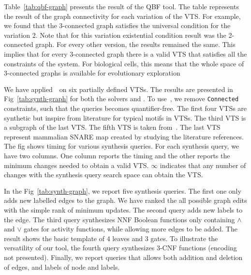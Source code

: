 Table~\ref{tab:qbf-graph} presents the result of the QBF tool.
%
The table represents the result of the graph connectivity for each variation of the VTS.  
%
For example, we found that the 3-connected graph satisfies the universal condition for the variation 2. 
%
Note that for this variation existential condition result was the 2-connected graph. 
%
For every other version, the results remained the same.
%
This implies that for every 3-connected graph there is a valid VTS that satisfies all the constraints of the system.
% 
For biological cells, this means that the whole space of 3-connected graphs is available for evolutionary exploration
%



We have applied~\ourtool~on six partially defined VTSs.
%
The results are presented in Fig~\ref{tab:synth-graph} for both the solvers
\depqbf and \zthree.
%
To use~\zthree, we remove \texttt{Connected} constraints, such that the queries becomes
quantifier-free.
%
%
%
The first four VTSs are synthetic but inspire from literature for
typical motifs in VTSs. 
The third VTS is a subgraph of the last VTS.
%
%
The fifth VTS is taken from~\cite{burri2004complete}.
%
The last VTS represent mammalian SNARE map created by studying the literature references.  
%
The fig shows timing for various synthesis queries.
%
For each synthesis query, we have two columns.
%
One column reports the timing and the other reports the minimum changes needed to obtain a valid VTS.
%
$\infty$ indicates that any number of changes with the synthesis query
search space can obtain the VTS.
%

In the Fig~\ref{tab:synth-graph}, we report five synthesis queries.
%
The first one only adds new labelled edges to the graph.
%
We have ranked the all possible graph edits with the simple rank of
minimum updates.
%
The second query adds new labels to the edge.
%
The third query synthesizes NNF Boolean functions only containing
$\land$ and $\lor$ gates for activity functions, while allowing
more edges to be added.
%
The result shows the basic template of 4 leaves and 3 gates.
%
%
To illustrate the versatility of our tool, the fourth query
synthesizes $3$-CNF functions (encoding not presented).
%
Finally, we report queries that allows both addition and deletion of edges, and labels
of node and labels. 

